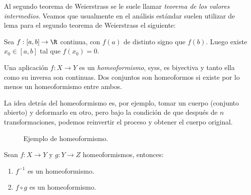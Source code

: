 \documentclass[11pt,oneside,a4paper]{book}
\begin{document}
Al segundo teorema de Weierstrass se le suele llamar \textit{teorema de los valores intermedios}. Veamos que usualmente en el análisis estándar suelen utilizar de lema para el segundo teorema de Weierstrass el siguiente:
\begin{thm}
Sea $f:[a,b]\rightarrow\R$ continua, con $f(a)$ de distinto signo que $f(b)$. Luego existe $x_0\in[a,b]$ tal que $f(x_0)=0$.
\end{thm}
\begin{mydef}[Homeoformismo]
Una aplicación $f:X\rightarrow Y$ es un \textit{homeoformismo}, syss, es biyectiva y tanto ella como su inversa son continuas. Dos conjuntos son homeoformos si existe por lo menos un homeoformismo entre ambos.
\end{mydef}
La idea detrás del homeoformismo es, por ejemplo, tomar un cuerpo (conjunto abierto) y deformarlo en otro, pero bajo la condición de que después de $n$ transformaciones, podemos reinvertir el proceso y obtener el cuerpo original.
\begin{figure}
\centering
{}
\caption{Ejemplo de homeoformismo.}
\end{figure}
\begin{prop}
Sean $f:X\rightarrow Y$ y $g:Y\rightarrow Z$ homeoformismos, entonces:
\begin{enumerate}[$a$)]
\item $f^{-1}$ es un homeoformismo.
\item $f\circ g$ es un homeoformismo.
\end{enumerate}
\end{prop}
\end{document}
